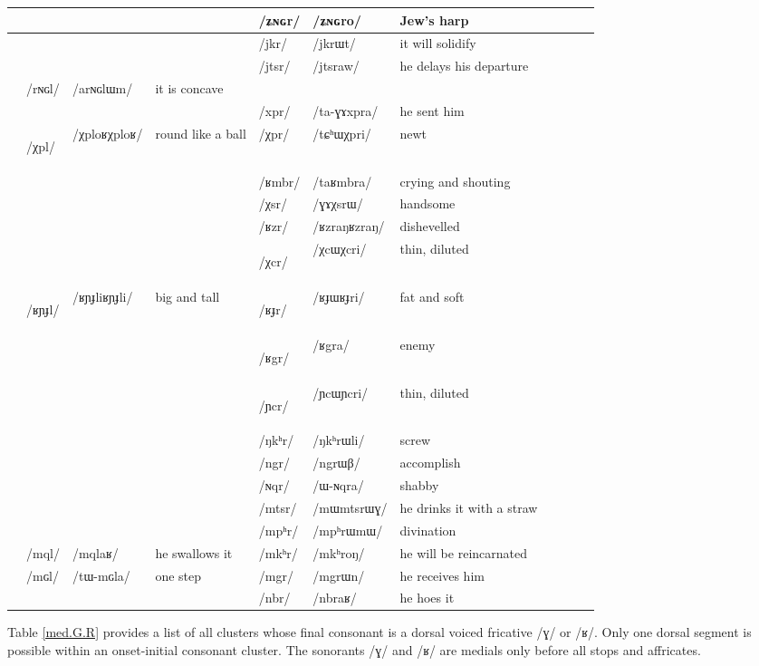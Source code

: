 \documentclass[oneside,a4paper,11pt]{article}
\newcommand{\ipa}[1]{\mbox{\phon/#1/}}
\newcommand{\trois}[1]{\ipa{#1}\addtocounter{3clusters}{1}}
\newcommand{\tib}[1]{\cellcolor{lightgray}\textbf{#1}}
\newcommand{\idph}[1]{\cellcolor{gray}\textbf{#1}}
\newcommand{\resetcounters}[2]{
\newcounter{#1}
\newcounter{#2}
 \setcounter{#1}{\value{2clusters}}
  \setcounter{#2}{\value{3clusters}}
 \setcounter{2clusters}{0}
  \setcounter{3clusters}{0}
}
\begin{document}
\begin{table}
{\begin{tabular}{l|lll|lll|lll|l}
	&	&	&	& \trois{ʑɴɢr}  	& \ipa{ʑɴɢro}  	&Jew's harp 	\\	
\midrule							
	&	&	&	&\trois{jkr}  	& \ipa{jkrɯt}  	& it will solidify \\	
	&	&	&	&\trois{jtsr}  	& \ipa{jtsraw}  	&he delays his departure \\	
\midrule			
	& \trois{rɴɢl}  	& \ipa{arɴɢlɯm}  	&it is concave 	&	&	&\\	
	&	&	&	& \trois{xpr}  	& \ipa{ta-ɣɤxpra}  	&he sent him \\	
\midrule							
	&\trois{χpl} \idph{}	&\ipa{χploʁχploʁ}  	&round like a ball	&\trois{χpr}  	& \ipa{tɕʰɯχpri}  	& newt\\	
	&	&	&	&\trois{ʁmbr}  	& \ipa{taʁmbra}  	& crying and shouting\\	
	&	&	&	&\trois{χsr}  	& \ipa{ɣɤχsrɯ}  	& handsome \\	
	&	&	&	&\trois{ʁzr}  	& \ipa{ʁzraŋʁzraŋ}  	& dishevelled\\	
	&	&	&	&\trois{χcr} \idph{} 	& \ipa{χcɯχcri}  	& thin, diluted \\	
	&\trois{ʁɲɟl}  \idph{}	& \ipa{ʁɲɟliʁɲɟli}  	& big and tall	&\trois{ʁɟr}  \idph{}	& \ipa{ʁɟɯʁɟri}  	& fat and soft\\	
	&	&	&	&\trois{ʁgr} \tib{}  	& \ipa{ʁgra}  	& enemy\\	
\midrule							
	&	&	&	&\trois{ɲcr} \idph{} 	& \ipa{ɲcɯɲcri}  	&thin, diluted \\	
	&	&	&	&\trois{ŋkʰr}  	& \ipa{ŋkʰrɯli}  	&screw \\	
	&	&	&	&\trois{ngr}  	& \ipa{ngrɯβ}  	& accomplish \\
	&	&	&	&\trois{ɴqr}  	& \ipa{ɯ-ɴqra}  	& shabby \\	
\midrule							
	&	&	&	&\trois{mtsr}  	& \ipa{mɯmtsrɯɣ}  	&he drinks it with a straw \\	
	&	&	&	&\trois{mpʰr}  	& \ipa{mpʰrɯmɯ}  	& divination\\	
	&\trois{mql}  	& \ipa{mqlaʁ}  	& he swallows it	&\trois{mkʰr}  	& \ipa{mkʰroŋ}  	&he will be reincarnated \\	
	&\trois{mɢl}  	& \ipa{tɯ-mɢla}  	& one step	&\trois{mgr}  	& \ipa{mgrɯn}  	& he receives him\\	
\midrule							
	&	&	&	&\trois{nbr}  	& \ipa{nbraʁ}  	&he hoes it \\	
\end{tabular}}
\end{table}	
			  \resetcounters{2Clr}{3Clr} %
 Table \ref{med.G.R} provides a  list of all clusters whose final consonant is a dorsal voiced fricative  \ipa{ɣ} or \ipa{ʁ}.  Only one dorsal segment is possible within an onset-initial consonant cluster. The sonorants \ipa{ɣ} and \ipa{ʁ} are medials only before all stops and affricates.
						
\end{document}

